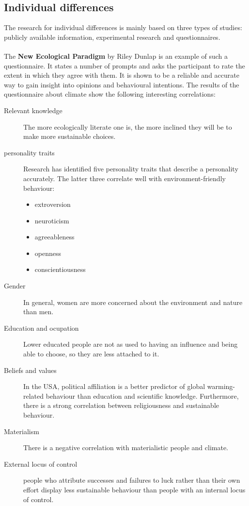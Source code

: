 \documentclass[../summary.tex]{subfiles}
\begin{document}
\subsection{Individual differences}
The research for individual differences is mainly based on three types of studies: publicly available information, experimental research and questionnaires.
\\\\
The \textbf{New Ecological Paradigm} by Riley Dunlap is an example of such a questionnaire. It states a number of prompts and asks the participant to rate the extent in which they agree with them. It is shown to be a reliable and accurate way to gain insight into opinions and behavioural intentions. The results of the questionnaire about climate show the following interesting correlations:
\begin{description}
	\item[Relevant knowledge] The more ecologically literate one is, the more inclined they will be to make more sustainable choices.
	\item[personality traits] Research has identified five personality traits that describe a personality accurately. The latter three correlate well with environment-friendly behaviour:
	      \begin{itemize}
		      \item extroversion
		      \item neuroticism
		      \item agreeableness
		      \item openness
		      \item conscientiousness
	      \end{itemize}
	\item[Gender] In general, women are more concerned about the environment and nature than men.
	\item[Education and ocupation] Lower educated people are not as used to having an influence and being able to choose, so they are less attached to it.
	\item[Beliefs and values] In the USA, political affiliation is a better predictor of global warming-related behaviour than education and scientific knowledge. Furthermore, there is a strong correlation between religiousness and sustainable behaviour.
	\item[Materialism] There is a negative correlation with materialistic people and climate.
	\item[External locus of control] people who attribute successes and failures to luck rather than their own effort display less sustainable behaviour than people with an internal locus of control.
\end{description}
\end{document}
